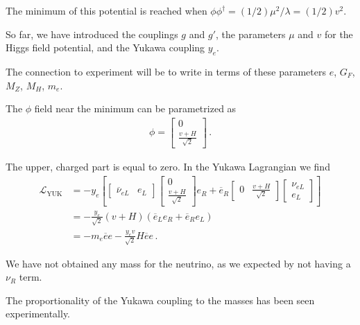 \documentclass[main.tex]{subfiles}
\begin{document}
The minimum of this potential is reached when \(\phi \phi ^\dag = (1/2 ) \mu^2 / \lambda = (1/2) v^2\).


So far, we have introduced the couplings \(g\) and \(g'\), the parameters \(\mu \) and \(v\) for the Higgs field potential, and the Yukawa coupling \(y_e\). 

The connection to experiment will be to write in terms of these parameters \(e\), \(G_F\), \(M_Z\), \(M_H\), \(m_e\). 


The \(\phi \) field near the minimum can be parametrized as 
%
\begin{align}
\phi = \left[\begin{array}{c}
0 \\ 
\frac{v + H}{\sqrt{2}}
\end{array}\right]
\,.
\end{align}

The upper, charged part is equal to zero. 
In the Yukawa Lagrangian we find 
%
\begin{align}
\mathscr{L} _{\text{YUK}} &= - y_e \left[ 
    \left[\begin{array}{cc}
    \overline{\nu}_{eL} & e_L
    \end{array}\right]
    \left[\begin{array}{c}
    0 \\ 
    \frac{v + H}{\sqrt{2}}
    \end{array}\right]
    e_R 
    + 
    \overline{e}_R 
    \left[\begin{array}{cc}
    0 & \frac{v + H}{\sqrt{2}}
    \end{array}\right]
    \left[\begin{array}{c}
    \nu_{eL} \\ 
    e_L
    \end{array}\right]
 \right]  \\
&= - \frac{y_e}{\sqrt{2}} \left(v + H\right)
\left( \overline{e}_L e_R + \overline{e}_R e_L\right)  \\
&= - m_e \overline{e} e - \frac{y_e v}{\sqrt{2}} H \overline{e} e
\,.
\end{align}

We have not obtained any mass for the neutrino, as we expected by not having a \(\nu _R\) term. 

The proportionality of the Yukawa coupling to the masses has been seen experimentally. 
\end{document}

